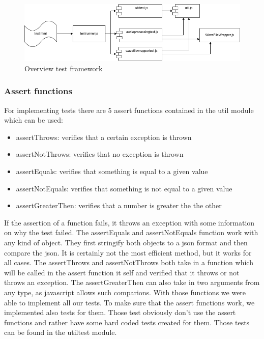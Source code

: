 \begin{figure}[H]
    \centering
    \includegraphics[width=\textwidth]{../assets/overview_test_framework.png}
    \caption{Overview test framework}
\end{figure}

\subsubsection{Assert functions}
For implementing tests there are 5 assert functions contained in the util module which can be used:

\begin{itemize}
    \item assertThrows: verifies that a certain exception is thrown
    \item assertNotThrows: verifies that no exception is thrown
    \item assertEquals: verifies that something is equal to a given value
    \item assertNotEquals: verifies that something is not equal to a given value
    \item assertGreaterThen: verifies that a number is greater the the other
\end{itemize}

If the assertion of a function fails, it throws an exception with some information on why the test failed.
The assertEquals and assertNotEquals function work with any kind of object. They first stringify both objects to a json format and then compare the json. It is certainly not the most efficient method, but it works for all cases. The assertThrows and assertNotThrows both take in a function which will be called in the assert function it self and verified that it throws or not throws an exception. The assertGreaterThen can also take in two arguments from any type, as javascript allows such comparions. With those functions we were able to implement all our tests. 
To make sure that the assert functions work, we implemented also tests for them. Those test obviously don't use the assert functions and rather have some hard coded tests created for them. Those tests can be found in the utiltest module.

